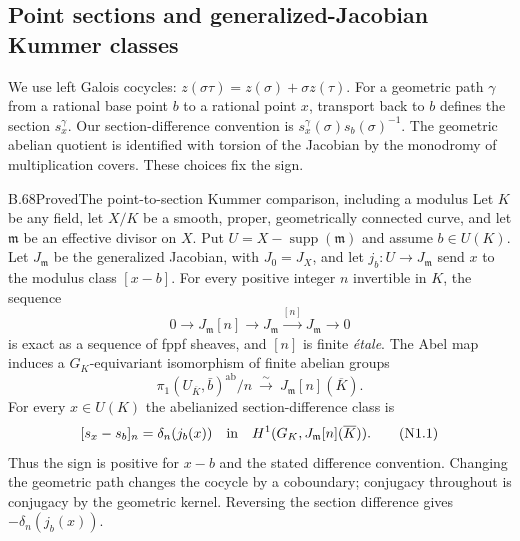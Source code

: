 \subsection{Point sections and generalized-Jacobian Kummer classes}

We use left Galois cocycles: $z(\sigma\tau)=z(\sigma)+\sigma z(\tau)$.
For a geometric path $\gamma$ from a rational base point $b$ to a
rational point $x$, transport back to $b$ defines the section $s_x^\gamma$.
Our section-difference convention is $s_x^\gamma(\sigma)s_b(\sigma)^{-1}$.
The geometric abelian quotient is identified with torsion of the Jacobian
by the monodromy of multiplication covers. These choices fix the sign.

\begin{claim}{B.68}{Proved}{The point-to-section Kummer comparison, including a modulus}
Let $K$ be any field, let $X/K$ be a smooth, proper, geometrically
connected curve, and let $\mathfrak m$ be an effective divisor on $X$.
Put $U=X-\operatorname{supp}(\mathfrak m)$ and assume $b\in U(K)$.
Let $J_{\mathfrak m}$ be the generalized Jacobian, with $J_0=J_X$, and
let $j_b:U\to J_{\mathfrak m}$ send $x$ to the modulus class $[x-b]$.
For every positive integer $n$ invertible in $K$, the sequence
\[
 0\longrightarrow J_{\mathfrak m}[n]\longrightarrow
 J_{\mathfrak m}\xrightarrow{[n]}J_{\mathfrak m}\longrightarrow0
\]
is exact as a sequence of fppf sheaves, and $[n]$ is finite \emph{\'etale}.
The Abel map induces a $G_K$-equivariant isomorphism of finite
abelian groups
\[
 \pi_1(U_{\overline K},\bar b)^{\mathrm{ab}}/n
 \ \xrightarrow{\sim}\ J_{\mathfrak m}[n](\overline K).
\]
For every $x\in U(K)$ the abelianized section-difference class is
\[
 [s_x-s_b]_n=\delta_n(j_b(x))\quad\hbox{in}\quad
 H^1(G_K,J_{\mathfrak m}[n](\overline K)).                 \tag{N1.1}
\]
Thus the sign is positive for $x-b$ and the stated difference convention.
Changing the geometric path changes the cocycle by a coboundary;
conjugacy throughout is conjugacy by the geometric kernel. Reversing
the section difference gives $-\delta_n(j_b(x))$.
\end{claim}
